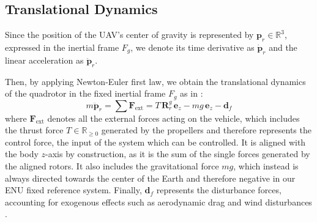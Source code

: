 \subsection{Translational Dynamics}
Since the position of the UAV's center of gravity is represented by \( \mathbf{p}_r \in \mathbb{R}^3 \), 
expressed in the inertial frame \( F_g \), we denote its time derivative as \( \dot{\mathbf{p}}_r \) and 
the linear acceleration as \( \ddot{\mathbf{p}}_r \).


Then, by applying Newton-Euler first law, we obtain the 
translational dynamics of the quadrotor in the fixed inertial frame $F_g$ as in \cite{simplified_model}:
\begin{equation}
m \ddot{\mathbf{p}}_r = \sum \mathbf{F}_{\text{ext}} 
= T \, \mathbf{R}_r^g \, \mathbf{e}_z - m g \, \mathbf{e}_z - \mathbf{d}_f
\label{eq:translational_dyn}
\end{equation}
where \( \mathbf{F}_{\text{ext}} \) denotes all the external forces acting on the vehicle, which
includes the thrust force \( T \in \mathbb{R}_{\geq 0} \) generated by the propellers and therefore  
represents the control force, the input of the system which can be controlled.
It is aligned with the body \( z \)-axis by construction, as it is the sum of the single
forces generated by the aligned rotors. 
It also includes the gravitational force \( m g \), which instead is always directed towards the center of 
the Earth and therefore negative in our ENU fixed reference system. 
Finally, \( \mathbf{d}_f \) represents the disturbance forces, accounting for exogenous effects such as 
aerodynamic drag and wind disturbances \cite{control_quadrotor_main}.


